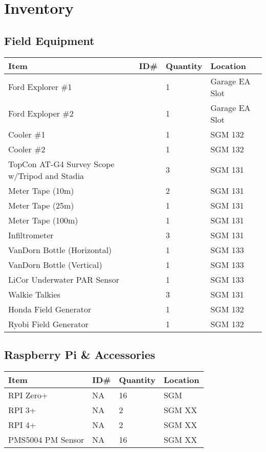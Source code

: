 \documentclass[12pt]{../SOP4_alpha}\usepackage[]{graphicx}\usepackage[]{color}
\begin{document}


\section{Inventory}

\subsection{Field Equipment}

\begin{tabular}{|l|l|l|l|}
\hline
Item      & ID\#  & Quantity & Location \\ \hline
Ford Explorer \#1 && 1 & Garage EA Slot \\
Ford Exploper \#2  && 1 & Garage EA Slot \\
Cooler \#1        && 1 & SGM 132 \\
Cooler \#2        && 1 & SGM 132 \\
TopCon AT-G4 Survey Scope w/Tripod and Stadia  && 3 & SGM 131 \\
Meter Tape (10m)  && 2 & SGM 131 \\
Meter Tape (25m)  && 1 & SGM 131 \\
Meter Tape (100m) && 1 & SGM 131 \\
Infiltrometer     && 3 & SGM 131 \\
VanDorn Bottle (Horizontal) && 1 & SGM 133 \\
VanDorn Bottle (Vertical) && 1 & SGM 133 \\
LiCor Underwater PAR Sensor  && 1 & SGM 133 \\

Walkie Talkies && 3 & SGM 131 \\
Honda Field Generator  && 1 & SGM 132 \\
Ryobi Field Generator && 1 & SGM 132 \\
\hline
\end{tabular}

\subsection{Raspberry Pi \& Accessories}

\begin{tabular}{|l|l|l|l|}
\hline
Item        & ID\#  & Quantity  & Location \\ \hline
RPI Zero+   & NA    & 16        & SGM \\
RPI 3+      & NA    & 2         & SGM XX \\
RPI 4+      & NA    & 2         & SGM XX \\
PMS5004 PM Sensor & NA & 16     & SGM XX \\
\hline
\end{tabular}
\end{document}

